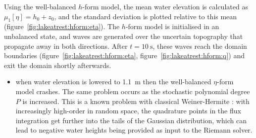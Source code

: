 Using the well-balanced $h$-form model, the mean water elevation is calculated as $\mu_1[\eta] = h_0 + z_0$, and the standard deviation is plotted relative to this mean (figure~\ref{fig:lakeatrest:hform:eta}).
The $h$-form model is initialised in an unbalanced state, and waves are generated over the uncertain topography that propagate away in both directions.  After $t = \SI{10}{\second}$, these waves reach the domain boundaries (figure~\ref{fig:lakeatrest:hform:eta}, figure~\ref{fig:lakeatrest:hform:q}) and exit the domain shortly afterwards.

\begin{itemize}
    \item when water elevation is lowered to \SI{1.1}{\meter} then the well-balanced $\eta$-form model crashes.  The same problem occurs as the stochastic polynomial degree $P$ is increased.
    This is a known problem with classical Weiner-Hermite \citep{pettersson2014}: with increasingly high-order in random space, the quadrature points in the flux integration get further into the tails of the Gaussian distribution, which can lead to negative water heights being provided as input to the Riemann solver.
\end{itemize}

